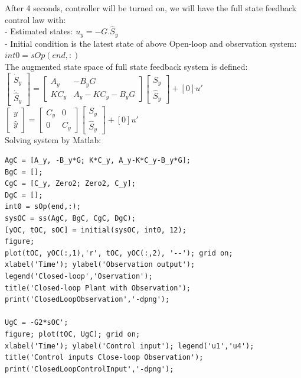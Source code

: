 \documentclass[14pt,a4paper]{article}
\begin{document}
	After 4 seconds, controller will be turned on, we will have the full state feedback control law with: \\
	- Estimated states: \hspace{1cm} $ u_y = - G.\hat{S}_y $ \\
	- Initial condition is the latest state of above Open-loop and observation system: \\ \hspace*{4.6cm} $ int0 = sOp(end,:) $ \\
	The augmented state space of full state feedback system is defined: \\
	\hspace*{2cm} $ \begin{bmatrix} \dot{S}_y \\ \dot{\hat{S}}_y \end{bmatrix} = \begin{bmatrix} A_y &-B_yG \\ KC_y& A_y - KC_y - B_yG \end{bmatrix}\begin{bmatrix} S_y \\ \hat{S}_y \end{bmatrix} + [0]u'$ \\
	
	\hspace*{1.8cm}$ \begin{bmatrix} y\\ \hat{y} \end{bmatrix} = \begin{bmatrix} C_y&0 \\ 0&C_y \end{bmatrix}\begin{bmatrix} S_y \\ \hat{S}_y \end{bmatrix} + [0]u'$ \\ 
	
	Solving system by Matlab:
\begin{lstlisting}
AgC = [A_y, -B_y*G; K*C_y, A_y-K*C_y-B_y*G];
BgC = [];
CgC = [C_y, Zero2; Zero2, C_y];
DgC = [];
int0 = sOp(end,:);
sysOC = ss(AgC, BgC, CgC, DgC);
[yOC, tOC, sOC] = initial(sysOC, int0, 12);
figure;
plot(tOC, yOC(:,1),'r', tOC, yOC(:,2), '--'); grid on;
xlabel('Time'); ylabel('Observation output');
legend('Closed-loop','Oservation');
title('Closed-loop Plant with Observation');
print('ClosedLoopObservation','-dpng');

UgC = -G2*sOC';
figure; plot(tOC, UgC); grid on;
xlabel('Time'); ylabel('Control input'); legend('u1','u4');
title('Control inputs Close-loop Observation');
print('ClosedLoopControlInput','-dpng');
\end{lstlisting}
\pagebreak
\end{document}
